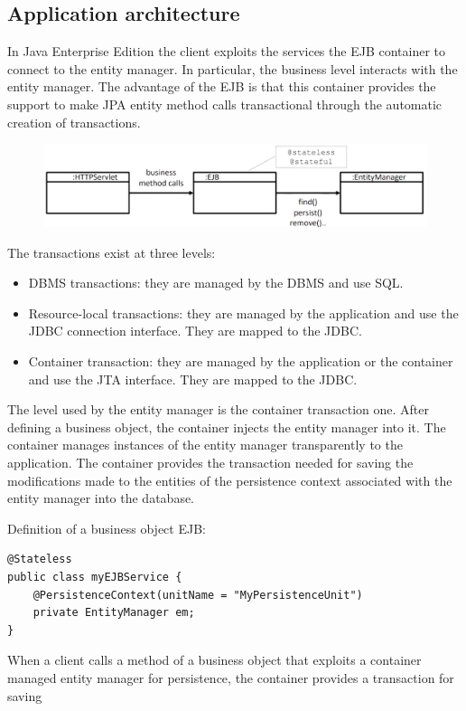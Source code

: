 \documentclass[12pt, a4paper]{report}
\begin{document}
    \subsection{Application architecture}
    In Java Enterprise Edition the client exploits the services the EJB container to connect to the entity manager. In particular, the business level interacts with 
    the entity manager. The advantage of the EJB is that this container provides the support to make JPA entity method calls transactional through the automatic creation 
    of transactions. 
    \begin{figure}[H]
        \centering
        \includegraphics[width=0.75\linewidth]{images/jee1.png}
    \end{figure}
    The transactions exist at three levels: 
    \begin{itemize}
        \item DBMS transactions: they are managed by the DBMS and use SQL. 
        \item Resource-local transactions: they are managed by the application and use the JDBC connection interface. They are mapped to the JDBC. 
        \item Container transaction: they are managed by the application or the container and use the JTA interface. They are mapped to the JDBC. 
    \end{itemize}
    The level used by the entity manager is the container transaction one. After defining a business object, the container injects the entity manager into it. The 
    container manages instances of the entity manager transparently to the application. The container provides the transaction needed for saving the modifications made 
    to the entities of the persistence context associated with the entity manager into the database. 
    \begin{example}
        Definition of a business object EJB: 
        \begin{lstlisting}[style=Java]
@Stateless 
public class myEJBService {
    @PersistenceContext(unitName = "MyPersistenceUnit")
    private EntityManager em; 
}
        \end{lstlisting}
    \end{example}
    When a client calls a method of a business object that exploits a container managed entity manager for persistence, the container provides a transaction for saving 
\end{document}

